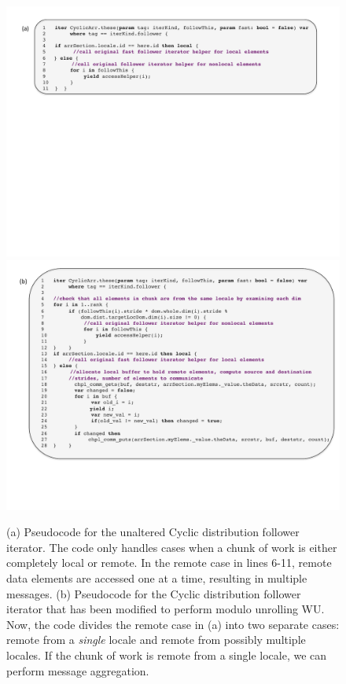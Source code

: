 \begin{figure}
\begin{center}
\includegraphics[width=\linewidth]{./Figures/cyclic_muwu_follower_before}
\includegraphics[width=\linewidth]{./Figures/cyclic_muwu_follower_after}
\caption{(a) Pseudocode for the unaltered Cyclic distribution follower iterator. The code only handles cases when a chunk of work is either completely local or remote. In the remote case in lines 6-11, remote data elements are accessed one at a time, resulting in multiple messages. (b) Pseudocode for the Cyclic distribution follower iterator that has been modified to perform modulo unrolling WU. Now, the code divides the remote case in (a) into two separate cases: remote from a \textit{single} locale and remote from possibly multiple locales. If the chunk of work is remote from a single locale, we can perform message aggregation.  }
\label{cyclic_muwu_follower}
\end{center}
\end{figure}

